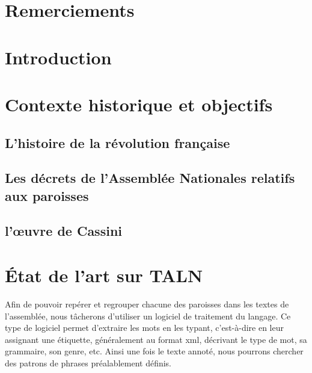 \documentclass[a4paper]{book}
\begin{document}

\newpage
\chapter{Remerciements}




\chapter{Introduction}



 
\mainmatter
\chapter{Contexte historique et objectifs}
\section{L'histoire de la révolution française}


\section{Les décrets de l'Assemblée Nationales relatifs aux paroisses}
\section{l’œuvre de Cassini}


\pagebreak





\newpage
\chapter{État de l'art sur TALN}

Afin de pouvoir repérer et regrouper chacune des paroisses dans les textes de l’assemblée, nous tâcherons d'utiliser un logiciel de traitement du langage. Ce type de logiciel permet d'extraire les mots en les typant, c'est-à-dire en leur assignant une étiquette, généralement au format xml, décrivant le type de mot, sa grammaire, son genre, etc. Ainsi une fois le texte annoté, nous pourrons chercher des patrons de phrases préalablement définis.
\end{document}
